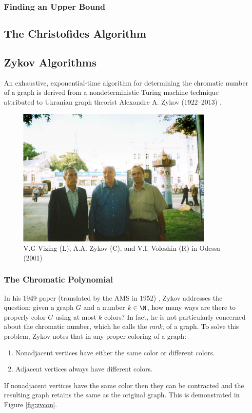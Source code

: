\subsubsection{Finding an Upper Bound}\label{sec:sub:sub:upper}

\subsection{The Christofides Algorithm}\label{sec:sub:christofides}

\subsection{Zykov Algorithms}\label{sec:sub:zykov}

An exhaustive, exponential-time algorithm for determining the chromatic number of a graph is derived from a
nondeterministic Turing machine technique attributed to Ukranian graph theorist Alexandre A. Zykov (1922--2013)
\cite{obit}.

\begin{figure}[h]
  \label{fig:zykov}
  \begin{center}
    \includegraphics{zykov}
  \end{center}
  \caption{V.G Vizing (L), A.A. Zykov (C), and V.I. Voloshin (R) in Odessa (2001) \cite{voloshin}}
\end{figure}

\subsubsection{The Chromatic Polynomial}

In his 1949 paper (translated by the AMS in 1952) \cite{zykov}, Zykov addresses the question: given a graph \(G\) and
a number \(k\in\N\), how many ways are there to properly color \(G\) using at most \(k\) colors?  In fact, he is not
particularly concerned about the chromatic number, which he calls the \emph{rank}, of a graph.  To solve this problem,
Zykov notes that in any proper coloring of a graph:
\begin{enumerate}
\item Nonadjacent vertices have either the same color or different colors.
\item Adjacent vertices always have different colors.
\end{enumerate}
If nonadjacent vertices have the same color then they can be contracted and the resulting graph retains the same
 as the original graph.  This is demonstrated in Figure \ref{fig:zvcon}.

